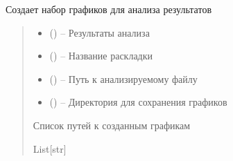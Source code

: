 \documentclass[a4paper,11pt,russian,openany,oneside]{sphinxmanual}
\begin{document}
\begin{savenotes}\begin{fulllineitems}
\label{\detokenize{data_module:data_module.make_export_plot.create_analysis_charts}}
\pysigstartsignatures
\pysiglinewithargsret
{}
{\sphinxparamcomma {}\sphinxparamcomma {}\sphinxparamcomma {}}
{}
\pysigstopsignatures
\sphinxAtStartPar
Создает набор графиков для анализа результатов
\begin{quote}\begin{description}
\begin{itemize}
\item {} 
\sphinxAtStartPar
{} (\sphinxstyleliteralemphasis{\sphinxupquote{{[}}}\sphinxstyleliteralemphasis{\sphinxupquote{, }}\sphinxstyleliteralemphasis{\sphinxupquote{{]}}}) – Результаты анализа

\item {} 
\sphinxAtStartPar
{} () – Название раскладки

\item {} 
\sphinxAtStartPar
{} () – Путь к анализируемому файлу

\item {} 
\sphinxAtStartPar
{} () – Директория для сохранения графиков

\end{itemize}

\sphinxAtStartPar
Список путей к созданным графикам

\sphinxAtStartPar
List{[}str{]}

\end{description}\end{quote}

\end{fulllineitems}\end{savenotes}
\end{document}
